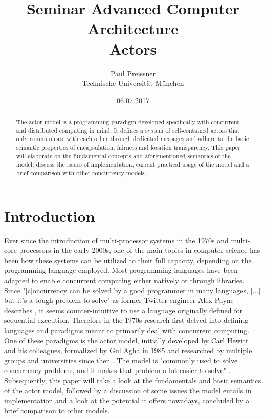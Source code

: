 \documentclass[A4]{article}
\author{Paul Preissner \\ Technische Universit\"at M\"unchen}
\title{Seminar Advanced Computer Architecture \\
       {\bf Actors}
}
\date{06.07.2017}
\begin{document}
\maketitle

\begin{abstract}
The actor model is a programming paradigm developed specifically with concurrent and distributed computing in mind. It defines a system of self-contained actors that only communicate with each other through dedicated messages and adhere to the basic semantic properties of encapsulation, fairness and location transparency. 
This paper will elaborate on the fundamental concepts and aforementioned semantics of the model, discuss the issues of implementation, current practical usage of the model and a brief comparison with other concurrency models. 
\end{abstract}

\section{Introduction}
\label{introduction}
Ever since the introduction of multi-processor systems in the 1970s and multi-core processors in the early 2000s, one of the main topics in computer science has been how these systems can be utilized to their full capacity, depending on the programming language employed. 
Most programming languages have been adapted to enable concurrent computing either natively or through libraries. Since "[c]oncurrency can be solved by a good programmer in many languages, [...] but it's a tough problem to solve" as former Twitter engineer Alex Payne describes \cite[p.~15]{Agha2016:2}, it seems counter-intuitive to use a language originally defined for sequential execution. Therefore in the 1970s research first delved into defining languages and paradigms meant to primarily deal with concurrent computing. One of these paradigms is the actor model, initially developed by Carl Hewitt and his colleagues, formalized by Gul Agha in 1985 and researched by multiple groups and universities since then \cite{reference/parallel/KarmaniA11}. The model is "commonly used to solve concurrency problems, and it makes that problem a lot easier to solve" \cite[p.~15]{Agha2016:2}.
Subsequently, this paper will take a look at the fundamentals and basic semantics of the actor model, followed by a discussion of some issues the model entails in implementation and a look at the potential it offers nowadays, concluded by a brief comparison to other models. 
\end{document}
